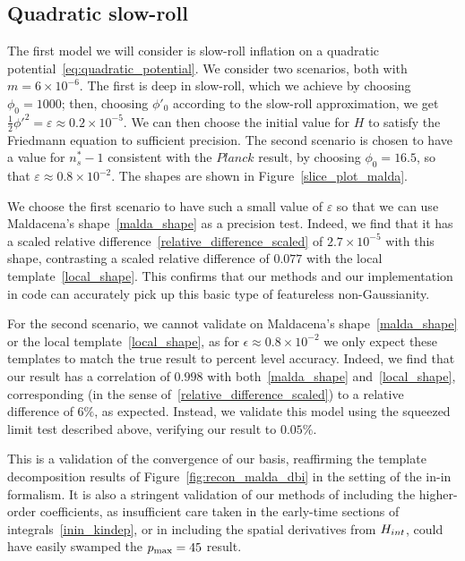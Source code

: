 \subsection{Quadratic slow-roll}
The first model we will consider is slow-roll inflation
on a quadratic potential~\eqref{eq:quadratic_potential}.
We consider two scenarios, both with $m=6\times10^{-6}$.
The first is deep in slow-roll, which we achieve by choosing
$\phi_0=1000$; then, choosing $\phi'_0$ according to the
slow-roll approximation, we get
$\frac{1}{2}\phi'^2=\varepsilon\approx0.2\times10^{-5}$.
We can then choose the initial value for $H$ to
satisfy the Friedmann equation to sufficient precision.
The second scenario is chosen to have a value for $n_s^{*}-1$
consistent with the $\textit{Planck}$ result,
by choosing $\phi_0=16.5$, so that $\varepsilon\approx0.8\times10^{-2}$.
The shapes are shown in Figure~\ref{slice_plot_malda}.


We choose the first scenario to have such a small value of $\varepsilon$
so that we can use Maldacena's shape~\eqref{malda_shape}
as a precision test.
Indeed, we find that it has a scaled relative difference~\eqref{relative_difference_scaled}
of $2.7\times10^{-5}$ with this shape,
contrasting a scaled relative difference
of $0.077$ with the local template~\eqref{local_shape}.
This confirms that our methods and our implementation in code can accurately
pick up this basic type of featureless non-Gaussianity.


For the second scenario, we cannot validate on
Maldacena's shape~\eqref{malda_shape} or the
local template~\eqref{local_shape},
as for $\epsilon\approx0.8\times10^{-2}$ we only expect
these templates to match the true result to percent level accuracy.
Indeed, we find that our result has a correlation of $0.998$
with both~\eqref{malda_shape} and~\eqref{local_shape},
corresponding (in the sense of~\eqref{relative_difference_scaled})
to a relative difference of $6\%$,
as expected.
Instead, we validate this model using
the squeezed limit test described above,
verifying our result to $0.05\%$.


This is a validation of the convergence of our basis,
reaffirming the template decomposition results of Figure~\ref{fig:recon_malda_dbi}
in the setting of the in-in formalism.
It is also a stringent validation of our methods of including the higher-order
coefficients, as insufficient care taken in the early-time sections of
integrals~\eqref{inin_kindep}, or in including the spatial derivatives
from $H_{int}$, could have easily swamped the $p_\text{max}=45$ result.


